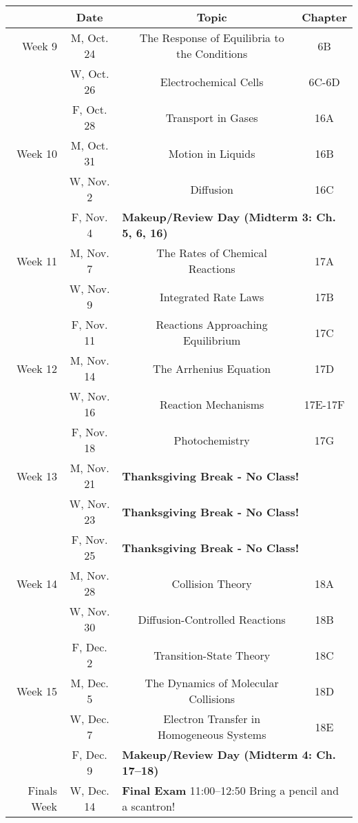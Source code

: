 \documentclass[12pt, letterpaper]{article}
\begin{document}
\noindent
\begin{tabular}{rcccc}
& Date && Topic & Chapter\\
\midrule
Week 9 & M, Oct. 24&& The Response of Equilibria to the Conditions & 6B\\
& W, Oct. 26&& Electrochemical Cells & 6C-6D\\
& F, Oct. 28&& Transport in Gases & 16A\\
\midrule
Week 10 & M, Oct. 31&& Motion in Liquids & 16B\\
& W, Nov. 2&& Diffusion & 16C\\
& F, Nov. 4& \multicolumn{3}{l}{\textbf{Makeup/Review Day (Midterm 3: Ch. 5, 6, 16)}}\\
\midrule
Week 11 & M, Nov. 7&& The Rates of Chemical Reactions & 17A\\
& W, Nov. 9&& Integrated Rate Laws & 17B\\
& F, Nov. 11&& Reactions Approaching Equilibrium & 17C\\
\midrule
Week 12 & M, Nov. 14&& The Arrhenius Equation & 17D\\
& W, Nov. 16&& Reaction Mechanisms & 17E-17F\\
& F, Nov. 18&& Photochemistry & 17G\\
\midrule
Week 13 & M, Nov. 21& \multicolumn{3}{l}{\textbf{Thanksgiving Break - No Class!}}\\
& W, Nov. 23& \multicolumn{3}{l}{\textbf{Thanksgiving Break - No Class!}}\\
& F, Nov. 25& \multicolumn{3}{l}{\textbf{Thanksgiving Break - No Class!}}\\
\midrule
Week 14 & M, Nov. 28&& Collision Theory & 18A\\
& W, Nov. 30&& Diffusion-Controlled Reactions & 18B\\
& F, Dec. 2&& Transition-State Theory & 18C\\
\midrule
Week 15 & M, Dec. 5&& The Dynamics of Molecular Collisions & 18D\\
& W, Dec. 7&& Electron Transfer in Homogeneous Systems & 18E\\
& F, Dec. 9& \multicolumn{3}{l}{\textbf{Makeup/Review Day (Midterm 4: Ch. 17--18)}}\\
	\midrule
	\midrule
	Finals Week & W, Dec. 14 & \multicolumn{3}{l}{\textbf{Final Exam} 11:00--12:50  Bring a pencil and a scantron!}                                                      \\
\end{tabular}
\end{document}
